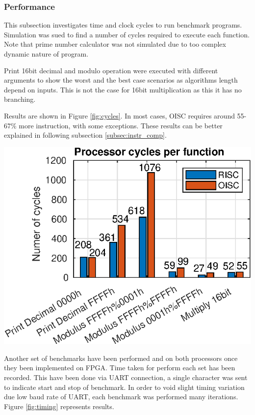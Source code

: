 \subsubsection{Performance}
This subsection investigates time and clock cycles to run benchmark programs. Simulation was sued to find a number of cycles required to execute each function. Note that prime number calculator was not simulated due to too complex dynamic nature of program. 

Print 16bit decimal and modulo operation were executed with different arguments to show the worst and the best case scenarios as algorithms length depend on inputs. This is not the case for 16bit multiplication as this it has no branching. 

Results are shown in Figure \ref{fig:cycles}. In most cases, OISC requires around 55-67\% more instruction, with some exceptions. These results can be better explained in following subsection \ref{subsec:instr_comp}.

\begin{colfigure}
	\centering
	\includegraphics[width=\linewidth]{../tests/cycles.eps}
	\label{fig:cycles}
\end{colfigure}

Another set of benchmarks have been performed and on both processors once they been implemented on FPGA. Time taken for perform each set has been recorded. This have been done via UART connection, a single character was sent to indicate start and stop of benchmark. In order to void slight timing variation due low baud rate of UART, each benchmark was performed many iterations. Figure \ref{fig:timing} represents results.

